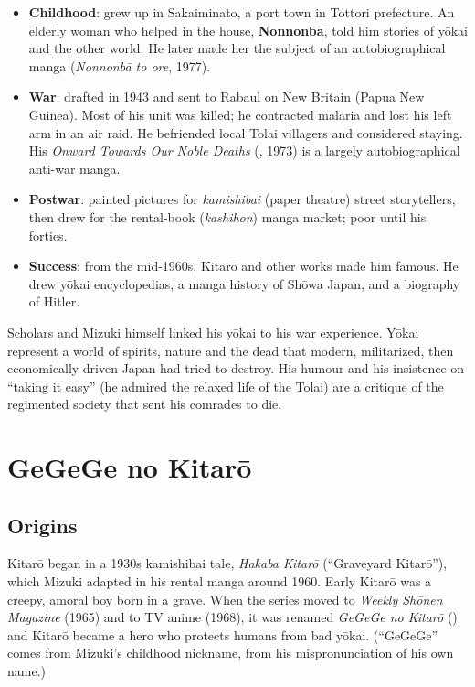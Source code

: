 \begin{itemize}
  \item \textbf{Childhood}: grew up in Sakaiminato, a port town in Tottori prefecture. An
        elderly woman who helped in the house, \textbf{Nonnonbā}, told him stories of yōkai
        and the other world. He later made her the subject of an autobiographical manga
        (\emph{Nonnonbā to ore}, 1977).
  \item \textbf{War}: drafted in 1943 and sent to Rabaul on New Britain (Papua New Guinea).
        Most of his unit was killed; he contracted malaria and lost his left arm in an air
        raid. He befriended local Tolai villagers and considered staying. His
        \emph{Onward Towards Our Noble Deaths} (, 1973) is a
        largely autobiographical anti-war manga.
  \item \textbf{Postwar}: painted pictures for \emph{kamishibai} (paper theatre) street
        storytellers, then drew for the rental-book (\emph{kashihon}) manga market; poor
        until his forties.
  \item \textbf{Success}: from the mid-1960s, Kitarō and other works made him famous. He
        drew yōkai encyclopedias, a manga history of Shōwa Japan, and a biography of Hitler.
\end{itemize}

\begin{important}
Scholars and Mizuki himself linked his yōkai to his war experience. Yōkai represent a
world of spirits, nature and the dead that modern, militarized, then economically driven
Japan had tried to destroy. His humour and his insistence on ``taking it easy'' (he
admired the relaxed life of the Tolai) are a critique of the regimented society that sent
his comrades to die.
\end{important}

\section{GeGeGe no Kitarō}

\subsection{Origins}

Kitarō began in a 1930s kamishibai tale, \emph{Hakaba Kitarō} (``Graveyard Kitarō''), which
Mizuki adapted in his rental manga around 1960. Early Kitarō was a creepy, amoral boy born
in a grave. When the series moved to \emph{Weekly Shōnen Magazine} (1965) and to TV anime
(1968), it was renamed \emph{GeGeGe no Kitarō} () and Kitarō became a
hero who protects humans from bad yōkai. (``GeGeGe'' comes from Mizuki's childhood
nickname, from his mispronunciation of his own name.)

